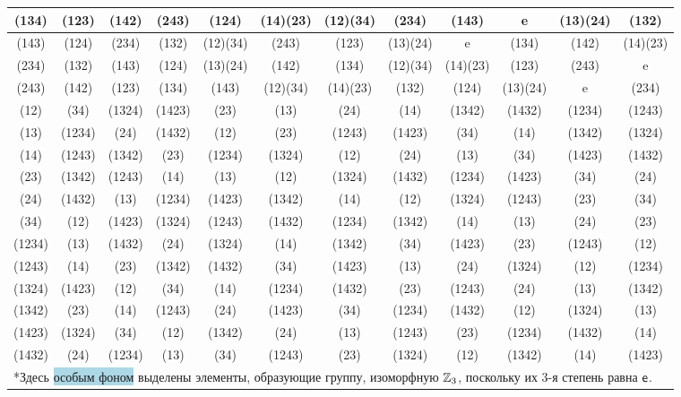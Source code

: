 \begin{table}[h!]
\begin{tabular}{c|ccccccccccc}
(134) & (123) & (142) & (243) & (124) & (14)(23) & (12)(34) & (234) & \cellcolor{lightBlue}(143) & \cellcolor{lightBlue}e & (13)(24) & (132) \\ \hline\rowcolor{lightGreen}
(143) & (124) & (234) & (132) & (12)(34) & (243) & (123) & (13)(24) & \cellcolor{lightBlue}e & \cellcolor{lightBlue}(134) & (142) & (14)(23) \\ \hline\rowcolor{lightGreen}
(234) & (132) & (143) & (124) & (13)(24) & (142) & (134) & (12)(34) & (14)(23) & (123) & \cellcolor{lightBlue}(243) & \cellcolor{lightBlue}e \\ \hline\rowcolor{lightGreen}
(243) & (142) & (123) & (134) & (143) & (12)(34) & (14)(23) & (132) & (124) & (13)(24) & \cellcolor{lightBlue}e & \cellcolor{lightBlue}(234) \\ \hline
\cellcolor{yellow}(12) &\cellcolor{yellow} (34) &\cellcolor{yellow} (1324) &\cellcolor{yellow} (1423) & (23) & (13) & (24) & (14) & (1342) & (1432) & (1234) & (1243) \\ \hline
(13) & (1234) & (24) & (1432) & (12) & (23) & (1243) & (1423) & (34) & (14) & (1342) & (1324) \\ \hline
(14) & (1243) & (1342) & (23) & (1234) & (1324) & (12) & (24) & (13) & (34) & (1423) & (1432) \\ \hline
(23) & (1342) & (1243) & (14) & (13) & (12) & (1324) & (1432) & (1234) & (1423) & (34) & (24) \\ \hline
(24) & (1432) & (13) & (1234) & (1423) & (1342) & (14) & (12) & (1324) & (1243) & (23) & (34) \\ \hline
\cellcolor{yellow}(34) &\cellcolor{yellow} (12) &\cellcolor{yellow} (1423) &\cellcolor{yellow} (1324) & (1243) & (1432) & (1234) & (1342) & (14) & (13) & (24) & (23) \\ \hline
(1234) & (13) & (1432) & (24) & (1324) & (14) & (1342) & (34) & (1423) & (23) & (1243) & (12) \\ \hline
(1243) & (14) & (23) & (1342) & (1432) & (34) & (1423) & (13) & (24) & (1324) & (12) & (1234) \\ \hline
\cellcolor{yellow}(1324) & \cellcolor{yellow}(1423) &\cellcolor{yellow} (12) &\cellcolor{yellow} (34) & (14) & (1234) & (1432) & (23) & (1243) & (24) & (13) & (1342) \\ \hline
(1342) & (23) & (14) & (1243) & (24) & (1423) & (34) & (1234) & (1432) & (12) & (1324) & (13) \\ \hline
\cellcolor{yellow}(1423) &\cellcolor{yellow} (1324) &\cellcolor{yellow} (34) &\cellcolor{yellow} (12) & (1342) & (24) & (13) & (1243) & (23) & (1234) & (1432) & (14) \\ \hline
(1432) & (24) & (1234) & (13) & (34) & (1243) & (23) & (1324) & (12) & (1342) & (14) & (1423) \\ \hline
\multicolumn{12}{l}{*Здесь \colorbox{lightBlue}{особым фоном} выделены элементы, образующие группу, изоморфную $\mathbb Z_3$, поскольку их 3-я степень равна $\mathsf e$.}
\end{tabular}
\end{table}

